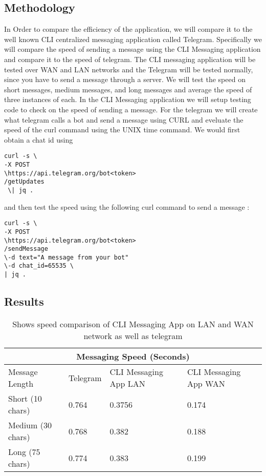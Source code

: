 \documentclass[twoside]{article}
\begin{document}
\begin{multicols}{2}
\subsection{Methodology}
In Order to compare the efficiency of the application, we will compare it to the well known CLI centralized messaging application called Telegram. Specifically we will compare the speed of sending a message using the CLI Messaging application and compare it to the speed of telegram. The CLI messaging application will be tested over WAN and LAN networks and the Telegram will be tested normally, since you have to send a message through a server. We will test the speed on short messages, medium messages, and long messages and average the speed of three instances of each. In the CLI Messaging application we will setup testing code to check on the speed of sending a message. For the telegram we will create what telegram calls a bot and send a message using CURL and eveluate the speed of the curl command using the UNIX time command. We would first obtain a chat id using 
\begin{lstlisting}
curl -s \ 
-X POST 
\https://api.telegram.org/bot<token>
/getUpdates
 \| jq .
\end{lstlisting} 
and then test the speed using the following curl command to send a message \cite{malizia}: 
\begin{lstlisting}
curl -s \
-X POST 
\https://api.telegram.org/bot<token>
/sendMessage 
\-d text="A message from your bot" 
\-d chat_id=65535 \ 
| jq .
\end{lstlisting} 
\centering
\subsection{Results}
\begin{table*}[t]
\centering
\begin{tabular}{ |p{3cm}||p{3cm}|p{3cm}|p{3cm}|  }
 \hline
 \multicolumn{4}{|c|}{Messaging Speed (Seconds)} \\
 \hline
Message Length& Telegram &CLI Messaging App LAN &CLI Messaging App WAN \\
 \hline
 Short (10 chars)   &0.764&0.3756& 0.174\\
 Medium (30 chars)&0.768  &0.382& 0.188\\
 Long (75 chars) &0.774 & 0.383&0.199 \\
 \hline
\end{tabular}
\caption{ Shows speed comparison of CLI Messaging App on LAN and WAN network as well as telegram}
\end{table*}
\FloatBarrier


\end{multicols}
\end{document}
